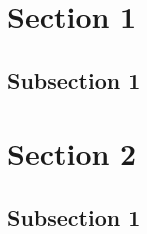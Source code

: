 \documentclass[10pt]{article}
\begin{document}
\titleM

\newpage
\tableofcontents
\newpage

\section{Section 1}

\subsection{Subsection 1}

  \begin{figure}[h!]
    \centering
    \begin{subfigure}[b]{0.35\textwidth}
      \caption{}
      \label{fig:}
    \end{subfigure}
    \begin{subfigure}[b]{0.35\textwidth}
      \caption{}
      \label{fig:}
    \end{subfigure}
    \caption{}
    \label{fig:}
  \end{figure}


\section{Section 2}

\subsection{Subsection 1}

\newpage


\end{document}
